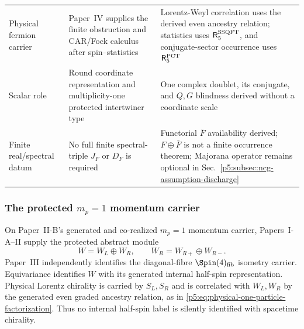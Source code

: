 \documentclass[12pt,a4paper]{article}
\begin{document}
\begin{table}[!htbp]
\begin{tabularx}{\textwidth}{>{\raggedright\arraybackslash}p{}
                                >{\raggedright\arraybackslash}X
                                >{\raggedright\arraybackslash}p{}}
Physical fermion carrier &
Paper~IV supplies the finite obstruction and CAR/Fock calculus after
spin--statistics &
Lorentz-Weyl correlation uses the derived even ancestry relation; statistics uses
\(\mathsf R_5^{\rm SSQFT}\), and conjugate-sector occurrence uses
\(\mathsf R_5^{\rm PCT}\) \\

Scalar role &
Round coordinate representation and multiplicity-one protected intertwiner type &
One complex doublet, its conjugate, and \(Q,G\) blindness derived without a coordinate scale \\

Finite real/spectral datum &
No full finite spectral-triple \(J_F\) or \(D_F\) is required &
Functorial \(\bar F\) availability derived; \(F\oplus\bar F\) is not a finite
occurrence theorem; Majorana operator remains optional in
Sec.~\ref{p5:subsec:ncg-assumption-discharge} \\

\bottomrule
\end{tabularx}

\end{table}

\subsubsection{The protected \texorpdfstring{\(m_p=1\)}{mp = 1} momentum carrier}
\label{p5:sec:part1-native-carrier}

On Paper~II-B's generated and co-realized \(m_p=1\) momentum carrier,
Papers~I-A--II supply the protected abstract module
\begin{equation}
\label{p5:eq:part1-K-split}
W=W_L\oplus W_R,
\qquad
W_R=W_{R+}\oplus W_{R-}.
\end{equation}
Paper~III independently identifies the diagonal-fibre
\(\Spin(4)_{\rm fib}\) isometry carrier.  Equivariance identifies \(W\) with
its generated internal half-spin representation.  Physical Lorentz chirality
is carried by \(S_L,S_R\) and is correlated with \(W_L,W_R\) by the generated
even graded ancestry relation, as in
\eqref{p5:eq:physical-one-particle-factorization}.  Thus no internal
half-spin label is silently identified with spacetime chirality.
\end{document}
